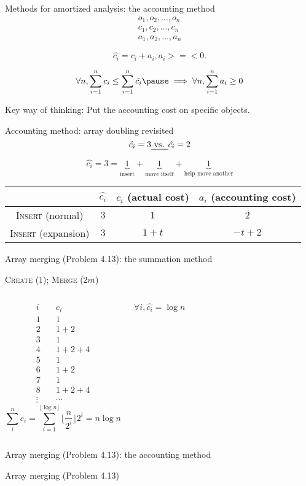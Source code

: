 \begin{frame}{Methods for amortized analysis: the accounting method}
  \begin{gather*}
	o_1, o_2, \ldots, o_n \\[5pt]
	c_1, c_2, \ldots, c_n \\[5pt]
	a_1, a_2, \ldots, a_n
  \end{gather*}

  \pause
  \[
    \hat{c_i} = c_i + a_i, a_i >=< 0. 
  \]

  \pause
  \[
	\forall n, \sum_{i=1}^{n} c_i \le \sum_{i=1}^{n} \hat{c_i} \pause \implies \forall n, \sum_{i=1}^{n} a_i \geq 0
  \]

  \pause
  \begin{alertblock}{Key way of thinking:}
	Put the accounting cost on specific objects.
  \end{alertblock}
\end{frame}
\begin{frame}{Accounting method: array doubling revisited}
  \[
    \hat{c_i} = 3 \text{\emph{ vs. }} \hat{c_i} = 2
  \]

  \pause
  \[
	\hat{c_i} = 3 = \underbrace{1}_{\textrm{insert}} +
	\underbrace{1}_{\textrm{move itself}} + \underbrace{1}_{\textrm{help move another}}
  \]

  \pause
  \begin{table}
    \begin{tabular}{c|ccc}
	  & $\hat{c_i}$ & $c_i$ (actual cost) & $a_i$ (accounting cost)
	  \\ \hline
	  \textsc{Insert} (normal) & $3$ & $1$ & $2$\\
	  \textsc{Insert} (expansion) & $3$ & $1 + t$ & $-t + 2$
    \end{tabular}
  \end{table}
\end{frame}
\begin{frame}{Array merging (Problem 4.13): the summation method}
  \centerline{\textsc{Create} ($1$); \textsc{Merge} ($2m$)}

  \begin{columns}
	  \pause
	  \begin{align*}
		i & \quad c_i \\
		1 & \quad 1  \\
		2 & \quad 1 + 2 \\
		3 & \quad 1 \\
		4 & \quad 1 + 2 + 4 \\
		5 & \quad 1 \\
		6 & \quad 1 + 2 \\
		7 & \quad 1 \\
		8 & \quad 1 + 2 + 4 \\
		\vdots & \quad \cdots
	  \end{align*}
	  \pause
	  \[
		\sum_{i}^{n} c_i = \sum_{i=1}^{\lfloor \log n \rfloor} \lfloor \frac{n}{2^i} \rfloor 2^i = n \log n
	  \]

	  \pause
	  \[
		\forall i, \hat{c_i} = \log n
	  \]
  \end{columns}
\end{frame}
\begin{frame}{Array merging (Problem 4.13): the accounting method}
\end{frame}
\begin{frame}{Array merging (Problem 4.13)}
\end{frame}
